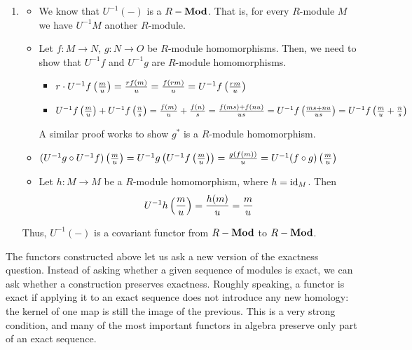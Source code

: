 \documentclass[Notebook.tex]{subfiles}
\begin{document}
\begin{solution}
\begin{enumerate}
        \item \begin{itemize}
            \item We know that $U^{-1}( - )$ is a $R-\operatorname{\textbf{Mod}}$. That is, for every $R$-module $M$ we have $U^{-1}M$ another $R$-module. 
            \item Let $f: M \to N$, $g: N \to O$ be $R$-module homomorphisms. Then, we need to show that $U^{-1}f$ and $U^{-1}g$ are $R$-module homomorphisms. 
            \begin{itemize}
                \item $r \cdot U^{-1}f\left(\frac{m}{u}\right) = \frac{rf(m)}{u} = \frac{f(rm)}{u} = U^{-1}f \left(\frac{rm}{u}\right)$
                \item $U^{-1}f \left(\frac{m}{u}\right)  + U^{-1}f \left(\frac{n}{s}\right) = \frac{f(m)}{u} + \frac{f(n)}{s} =  \frac{f(ms) + f(nu)}{ u s} = U^{-1}f \left(\frac{ms + nu}{ u s}\right) = U^{-1}f\left(\frac{m}{u}  + \frac{n}{s}\right)$
            \end{itemize}
            A similar proof works to show $g^*$ is a $R$-module homomorphism. 
            \item $(U^{-1}g \circ U^{-1}f)\left(\frac{m}{u}\right) = U^{-1}g\left(U^{-1}f\left(\frac{m}{u}\right)\right)= \frac{g(f(m))}{u}  = U^{-1}(f \circ g)\left(\frac{m}{u}\right)$
            \item Let $h: M \to M$ be a $R$-module homomorphism, where $h = \operatorname{id}_M$. Then 
            \[U^{-1}h \left(\frac{m}{u}\right) = \frac{h(m)}{u} = \frac{m}{u}\]
        \end{itemize}
        Thus, $U^{-1}(-)$ is a covariant functor from $R-\operatorname{\textbf{Mod}}$ to $R-\operatorname{\textbf{Mod}}$. 
    \end{enumerate}
\end{solution}

\newpage

\hrulefill

The functors constructed above let us ask a new version of the exactness question. Instead of asking whether a given sequence of modules is exact, we can ask whether a construction preserves exactness. Roughly speaking, a functor is exact if applying it to an exact sequence does not introduce any new homology: the kernel of one map is still the image of the previous. This is a very strong condition, and many of the most important functors in algebra preserve only part of an exact sequence.
\end{document}
